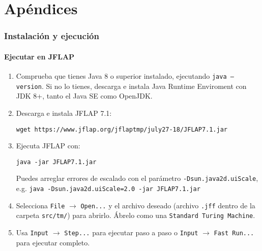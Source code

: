 \part{Apéndices}

\section{Instalación y ejecución}

\subsection*{Ejecutar en JFLAP\supercite{jflap}}
\begin{enumerate}
  \item Comprueba que tienes Java 8 o superior instalado, ejecutando \texttt{java --version}. Si no lo tienes, descarga e instala Java Runtime Enviroment con JDK 8+, tanto el Java SE como OpenJDK.
  \item Descarga e instala JFLAP 7.1:
  \begin{verbatim}
wget https://www.jflap.org/jflaptmp/july27-18/JFLAP7.1.jar
  \end{verbatim}
  \item Ejecuta JFLAP con:
  \begin{verbatim}
java -jar JFLAP7.1.jar
  \end{verbatim}
  Puedes arreglar errores de escalado con el parámetro \texttt{-Dsun.java2d.uiScale}, e.g. \texttt{java -Dsun.java2d.uiScale=2.0 -jar JFLAP7.1.jar}
  \item Selecciona \texttt{File} $\rightarrow$ \texttt{Open...} y el archivo deseado (archivo \texttt{.jff} dentro de la carpeta \texttt{src/tm/}) para abrirlo. Ábrelo como una \texttt{Standard Turing Machine}.
  \item Usa \texttt{Input} $\rightarrow$ \texttt{Step...} para ejecutar paso a paso o \texttt{Input} $\rightarrow$ \texttt{Fast Run...} para ejecutar completo.
\end{enumerate}


